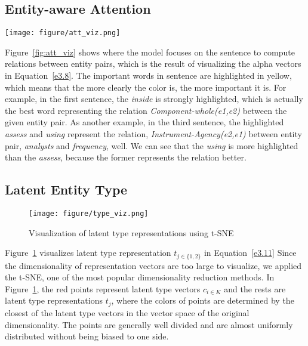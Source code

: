 \documentclass[twoside,leqno,twocolumn]{article}
\begin{document}
\subsection{Entity-aware Attention}
\begin{figure*}[!ht]
\texttt{[image: figure/att\_viz.png]}
\caption{Visualization of Entity-aware Attention}
\label{fig:att_viz}
\end{figure*}
Figure~\ref{fig:att_viz} shows where the model focuses on the sentence to compute relations between entity pairs, which is the result of visualizing the alpha vectors in Equation~\ref{e3.8}.
The important words in sentence are highlighted in yellow, which means that the more clearly the color is, the more important it is.
For example, in the first sentence, the \textit{inside} is strongly highlighted, which is actually the best word representing the relation \textit{Component-whole(e1,e2)} between the given entity pair.
As another example, in the third sentence, the highlighted \textit{assess} and \textit{using} represent the relation, \textit{Instrument-Agency(e2,e1)} between entity pair, \textit{analysts} and \textit{frequency}, well.
We can see that the \textit{using} is more highlighted than the \textit{assess}, because the former represents the relation better.


\subsection{Latent Entity Type}
\begin{figure}[!ht]
\texttt{[image: figure/type\_viz.png]}
\caption{Visualization of latent type representations using t-SNE}
\label{fig:type_viz}
\end{figure}
Figure~\ref{fig:type_viz} visualizes latent type representation $t_{j\in \{1,2\}}$ in Equation~\ref{e3.11}
Since the dimensionality of representation vectors are too large to visualize, we applied the t-SNE, one of the most popular dimensionality reduction methods.
In Figure~\ref{fig:type_viz}, the red points represent latent type vectors $c_{i\in K}$ and the rests are latent type representations $t_j$, where the colors of points are determined by the closest of the latent type vectors in the vector space of the original dimensionality.
The points are generally well divided and are almost uniformly distributed without being biased to one side.
\end{document}
